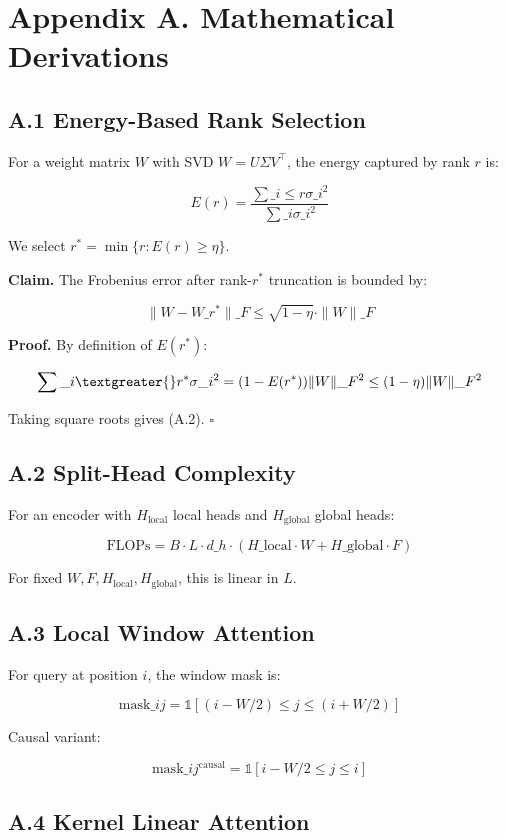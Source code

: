 \section{Appendix A. Mathematical Derivations}

\subsection{A.1 Energy-Based Rank Selection}

For a weight matrix $W$ with SVD $W = U \Sigma V^\top$, the energy captured 
by rank $r$ is:

\[
E(r) = \frac{\sum\_{i \leq r} \sigma\_i^2}{\sum\_{i} \sigma\_i^2}
\]

We select $r^* = \min \{ r : E(r) \geq \eta \}$.

\textbf{Claim.} The Frobenius error after rank-$r^*$ truncation is bounded by:

\[
\|W - W\_{r^*}\|\_F \leq \sqrt{1 - \eta} \cdot \|W\|\_F
\]

\textbf{Proof.} By definition of $E(r^*)$:

\[
\sum\_{i \textgreater{} r^*} \sigma\_i^2 = (1 - E(r^*)) \|W\|\_F^2 \leq (1 - \eta) \|W\|\_F^2
\]

Taking square roots gives (A.2). $\square$

\subsection{A.2 Split-Head Complexity}

For an encoder with $H_\text{local}$ local heads and $H_\text{global}$ 
global heads:

\[
\text{FLOPs} = B \cdot L \cdot d\_h \cdot (H\_\text{local} \cdot W + H\_\text{global} \cdot F)
\]

For fixed $W, F, H_\text{local}, H_\text{global}$, this is linear in $L$.

\subsection{A.3 Local Window Attention}

For query at position $i$, the window mask is:

\[
\text{mask}\_{ij} = \mathbb{1}[(i - W/2) \leq j \leq (i + W/2)]
\]

Causal variant:

\[
\text{mask}\_{ij}^\text{causal} = \mathbb{1}[i - W/2 \leq j \leq i]
\]

\subsection{A.4 Kernel Linear Attention}

